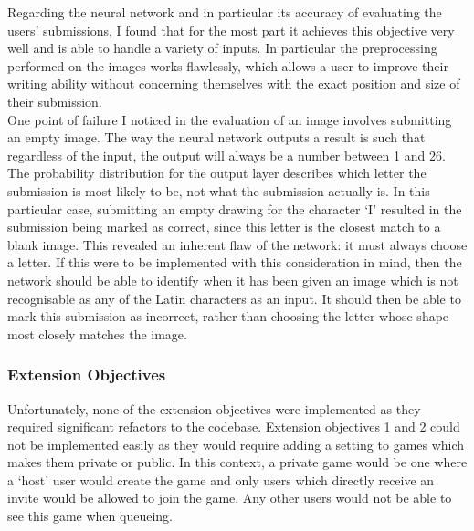\documentclass{article}
\begin{document}
\begin{enumerate}
    Regarding the neural network and in particular its accuracy of evaluating the users' submissions, I found that for the most part it achieves this objective very well and is able to handle a variety of inputs. In particular the preprocessing performed on the images works flawlessly, which allows a user to improve their writing ability without concerning themselves with the exact position and size of their submission. \\
    
    One point of failure I noticed in the evaluation of an image involves submitting an empty image. The way the neural network outputs a result is such that regardless of the input, the output will always be a number between 1 and 26. The probability distribution for the output layer describes which letter the submission is most likely to be, not what the submission actually is. In this particular case, submitting an empty drawing for the character `I' resulted in the submission being marked as correct, since this letter is the closest match to a blank image. This revealed an inherent flaw of the network: it must always choose a letter. If this were to be implemented with this consideration in mind, then the network should be able to identify when it has been given an image which is not recognisable as any of the Latin characters as an input. It should then be able to mark this submission as incorrect, rather than choosing the letter whose shape most closely matches the image.

\end{enumerate}

\subsubsection{Extension Objectives}

Unfortunately, none of the extension objectives were implemented as they required significant refactors to the codebase. Extension objectives 1 and 2 could not be implemented easily as they would require adding a setting to games which makes them private or public. In this context, a private game would be one where a `host' user would create the game and only users which directly receive an invite would be allowed to join the game. Any other users would not be able to see this game when queueing. \\
\end{document}
